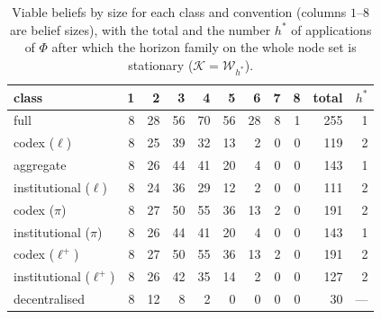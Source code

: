 \documentclass[11pt,a4paper]{article}
\theoremstyle{plain}
\theoremstyle{definition}
\theoremstyle{remark}
\newcommand{\calK}{\mathcal{K}}
\newcommand{\calW}{\mathcal{W}}
\newcommand{\led}{\ell}
\newcommand{\priv}{\pi}
\newcommand{\opt}{\ell^{+}}
\begin{document}
\begin{table}[H]
\centering\small
\caption{Viable beliefs by size for each class and convention (columns $1$--$8$ are belief sizes), with the total and the number $h^{\ast}$ of applications of $\Phi$ after which the horizon family on the whole node set is stationary ($\calK=\calW_{h^{\ast}}$).}
\label{tab:universe}
\begin{tabular}{lrrrrrrrrrr}
\toprule
class & 1 & 2 & 3 & 4 & 5 & 6 & 7 & 8 & total & $h^{\ast}$ \\
\midrule
full & 8 & 28 & 56 & 70 & 56 & 28 & 8 & 1 & 255 & 1 \\
codex ($\led$) & 8 & 25 & 39 & 32 & 13 & 2 & 0 & 0 & 119 & 2 \\
aggregate & 8 & 26 & 44 & 41 & 20 & 4 & 0 & 0 & 143 & 1 \\
institutional ($\led$) & 8 & 24 & 36 & 29 & 12 & 2 & 0 & 0 & 111 & 2 \\
codex ($\priv$) & 8 & 27 & 50 & 55 & 36 & 13 & 2 & 0 & 191 & 2 \\
institutional ($\priv$) & 8 & 26 & 44 & 41 & 20 & 4 & 0 & 0 & 143 & 1 \\
codex ($\opt$) & 8 & 27 & 50 & 55 & 36 & 13 & 2 & 0 & 191 & 2 \\
institutional ($\opt$) & 8 & 26 & 42 & 35 & 14 & 2 & 0 & 0 & 127 & 2 \\
decentralised & 8 & 12 & 8 & 2 & 0 & 0 & 0 & 0 & 30 & --- \\
\bottomrule
\end{tabular}
\end{table}
\end{document}

